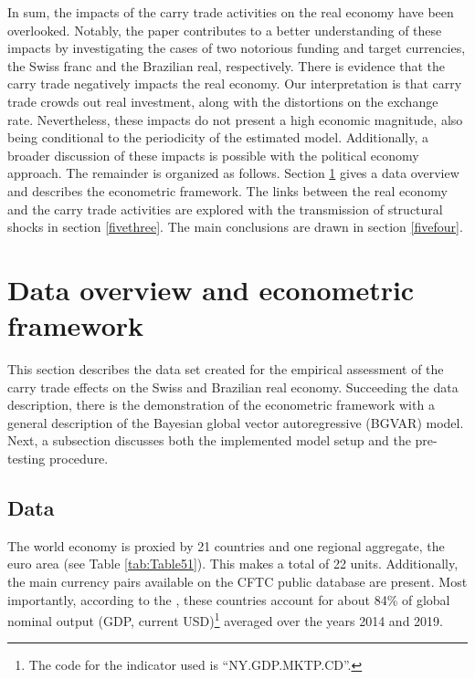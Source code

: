 \documentclass[a4paper, twoside]{templates/ociamthesis}
\begin{document}
In sum, the impacts of the carry trade activities on the real economy have been overlooked. Notably, the paper contributes to a better understanding of these impacts by investigating the cases of two notorious funding and target currencies, the Swiss franc and the Brazilian real, respectively. There is evidence that the carry trade negatively impacts the real economy. Our interpretation is that carry trade crowds out real investment, along with the distortions on the exchange rate. Nevertheless, these impacts do not present a high economic magnitude, also being conditional to the periodicity of the estimated model. Additionally, a broader discussion of these impacts is possible with the political economy approach. The remainder is organized as follows. Section \ref{fivetwo} gives a data overview and describes the econometric framework. The links between the real economy and the carry trade activities are explored with the transmission of structural shocks in section \ref{fivethree}. The main conclusions are drawn in section \ref{fivefour}.

\hypertarget{fivetwo}{%
\section{Data overview and econometric framework}\label{fivetwo}}

This section describes the data set created for the empirical assessment of the carry trade effects on the Swiss and Brazilian real economy. Succeeding the data description, there is the demonstration of the econometric framework with a general description of the Bayesian global vector autoregressive (BGVAR) model. Next, a subsection discusses both the implemented model setup and the pre-testing procedure.

\hypertarget{fivetwoone}{%
\subsection{Data}\label{fivetwoone}}

The world economy is proxied by 21 countries and one regional aggregate, the euro area (see Table \ref{tab:Table51}). This makes a total of 22 units. Additionally, the main currency pairs available on the CFTC public database are present. Most importantly, according to the \textcite{worldbank2021}, these countries account for about 84\% of global nominal output (GDP, current USD)\footnote{The code for the indicator used is ``NY.GDP.MKTP.CD''.} averaged over the years 2014 and 2019.
\end{document}
